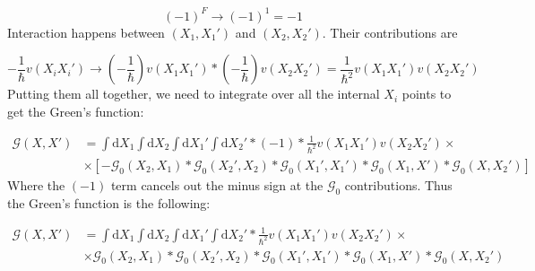 \begin{equation}
\left( -1 \right)^{F} \to \left( -1 \right)^{1} = -1
\end{equation}
Interaction happens between $\left( X_{1}, X_{1}' \right)$ and $\left( X_{2}, X_{2}' \right)$. Their contributions are

\begin{equation}
- \frac{1}{\hbar} v \left( X_{i} X_{i}' \right)
\to
\left( - \frac{1}{\hbar} \right) v \left( X_{1} X_{1}' \right)
*
\left( - \frac{1}{\hbar} \right) v \left( X_{2} X_{2}' \right)
=
\frac{1}{\hbar^{2}} v \left( X_{1} X_{1}' \right) v \left( X_{2} X_{2}' \right)
\end{equation}
Putting them all together, we need to integrate over all the internal $X_{i}$ points to get the Green's function:

\begin{align}
\mathcal{G} \left( X, X' \right)
&=
\int \text{d}X_{1} \int \text{d}X_{2} \int \text{d}X_{1}' \int \text{d}X_{2}'
*
\left( -1 \right)
*
\frac{1}{\hbar^{2}} v \left( X_{1} X_{1}' \right) v \left( X_{2} X_{2}' \right)
\times \nonumber \\
&\times
\left[
- \mathcal{G}_{0} \left( X_{2}, X_{1} \right)
*
\mathcal{G}_{0} \left( X_{2}', X_{2} \right)
*
\mathcal{G}_{0} \left( X_{1}', X_{1}' \right)
*
\mathcal{G}_{0} \left( X_{1}, X' \right)
*
\mathcal{G}_{0} \left( X, X_{2}' \right)
\right]
\end{align}
Where the $(-1)$ term cancels out the minus sign at the $\mathcal{G}_{0}$ contributions. Thus the Green's function is the following:

\begin{align}
\mathcal{G} \left( X, X' \right)
&=
\int \text{d}X_{1} \int \text{d}X_{2} \int \text{d}X_{1}' \int \text{d}X_{2}'
*
\frac{1}{\hbar^{2}} v \left( X_{1} X_{1}' \right) v \left( X_{2} X_{2}' \right)
\times \nonumber \\
&\times
\mathcal{G}_{0} \left( X_{2}, X_{1} \right)
*
\mathcal{G}_{0} \left( X_{2}', X_{2} \right)
*
\mathcal{G}_{0} \left( X_{1}', X_{1}' \right)
*
\mathcal{G}_{0} \left( X_{1}, X' \right)
*
\mathcal{G}_{0} \left( X, X_{2}' \right)
\end{align}
